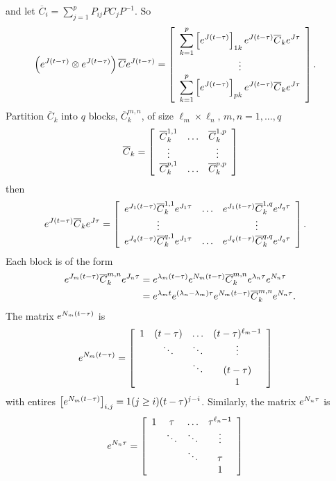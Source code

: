 \documentclass{article}
\begin{document}
and let \(\overline C_i = \displaystyle \sum_{j=1}^p P_{ij} P C_j P^{-1}\). So
\begin{align}
    \left(\Exp{J (t-\tau)}\otimes \Exp{J(t-\tau)}\right) \overline C \Exp{J(t-\tau)}
    &= \Matrix{c}{
        \displaystyle \sum_{k=1}^p\left[\Exp{J(t-\tau)}\right]_{1k} \Exp{J(t-\tau)}\overline C_k\Exp{J\tau} \\
        \vdots \\ 
        \displaystyle \sum_{k=1}^p\left[\Exp{J(t-\tau)}\right]_{pk} \Exp{J(t-\tau)}\overline C_k\Exp{J\tau}
    }.
\end{align}
Partition \(\overline C_k\) into \(q\) blocks, \(\overline C_k^{m,n}\), of size \(\ell_m\times \ell_n,\, m,n=1,...,q\)
\[\overline C_k = \Matrix{ccc}{
    \overline{C}_k^{1,1} & \hdots & \overline{C}_k^{1,p} \\
    \vdots & & \vdots \\
    \overline{C}_k^{p,1} & \hdots & \overline{C}_k^{p,p}
}\]
then 
\begin{align}
    \Exp{J(t-\tau)}\overline C_k\Exp{J\tau} &= \Matrix{ccc}{
        \Exp{J_1(t-\tau)} \overline{C}_k^{1,1} \Exp{J_1\tau} & \hdots & \Exp{J_1(t-\tau)} \overline{C}_k^{1,q} \Exp{J_q\tau}\\
        \vdots & & \vdots \\
        \Exp{J_q(t-\tau)} \overline{C}_k^{q,1} \Exp{J_1\tau} & \hdots & \Exp{J_q(t-\tau)} \overline{C}_k^{q,q} \Exp{J_q\tau}
    }.
\end{align}
Each block is of the form
\begin{align}
    \Exp{J_m(t-\tau)} \overline{C}_k^{m,n} \Exp{J_n\tau} 
    &= \Exp{\lambda_m(t-\tau)}\Exp{N_m(t-\tau)} \overline{C}_k^{m,n} \Exp{\lambda_n\tau}\Exp{N_n\tau}
    \\&= \Exp{\lambda_m t}\Exp{(\lambda_n-\lambda_m)\tau}\Exp{N_m(t-\tau)} \overline{C}_k^{m,n} \Exp{N_n\tau}.
\end{align}
The matrix \(\Exp{N_m(t-\tau)}\) is 
\begin{align}
    \Exp{N_m(t-\tau)} &= \Matrix{cccc}{
        1 & (t-\tau) & \hdots & (t-\tau)^{\ell_m-1} \\ 
        & \ddots & \ddots & \vdots \\
        & & \ddots & (t-\tau) \\
        &&& 1
    } 
\end{align}
with entires \(\left[\Exp{N_m(t-\tau)}\right]_{i,j}=1(j\geq i)(t-\tau)^{j-i}\). Similarly, the matrix \(\Exp{N_n\tau}\) is 
\begin{align}
    \Exp{N_n\tau} &= \Matrix{cccc}{
        1 & \tau & \hdots & \tau^{\ell_n-1} \\ 
        & \ddots & \ddots & \vdots \\
        & & \ddots & \tau \\
        &&& 1
    } 
\end{align}
\end{document}
